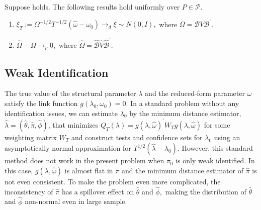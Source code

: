 \documentclass[11pt, letterpaper, twoside]{article}
\begin{document}
\begin{lemma}
\label{Lemma Reduce}
Suppose  holds. The following results hold uniformly over $P\in \mathcal{P}$.

\begin{enumerate}
    \item $\xi _{T}:=\Omega ^{-1/2}T^{-1/2}(\widehat{\omega } -\omega _{0})\rightarrow _{d}\xi \sim N(0,I),$ where $\Omega =\mathcal{B}V \mathcal{B}^{\prime }.$

    \item $\widehat{\Omega }-\Omega \rightarrow _{p}0,$ where $\widehat{\Omega }=\widehat{\mathcal{B}}\widehat{V}\widehat{\mathcal{B}}^{\prime }.$
\end{enumerate}
\end{lemma}

\subsection{Weak Identification}

The true value of the structural parameter $\lambda$ and the reduced-form parameter $\omega$ satisfy the link function $g(\lambda _{0},\omega _{0})=0$. In a standard problem without any identification issues, we can estimate $\lambda _{0}$ by the minimum distance estimator, $\widehat{\lambda } =(\widehat{\theta },\widehat{\pi },\widehat{\phi })$, that minimizes $ Q_{T}(\lambda )=g(\lambda ,\widehat{\omega })^{\prime }W_{T}g(\lambda , \widehat{\omega })$ for some weighting matrix $W_{T}$ and construct tests and confidence sets for $\lambda _{0}$ using an asymptotically normal approximation for $T^{1/2}(\widehat{\lambda }-\lambda _{0})$. However, this standard method does not work in the present problem when $\pi _{0}$ is only weak identified. In this case, $g(\lambda ,\widehat{\omega })$ is almost flat in $\pi $ and the minimum distance estimator of $\widehat{\pi }$ is not even consistent. To make the problem even more complicated, the inconsistency of $\widehat{\pi }$ has a spillover effect on $\widehat{\theta }$ and $\widehat{\phi },$ making the distribution of $\widehat{\theta }$ and $\widehat{\phi }$ non-normal even in large sample.
\end{document}
